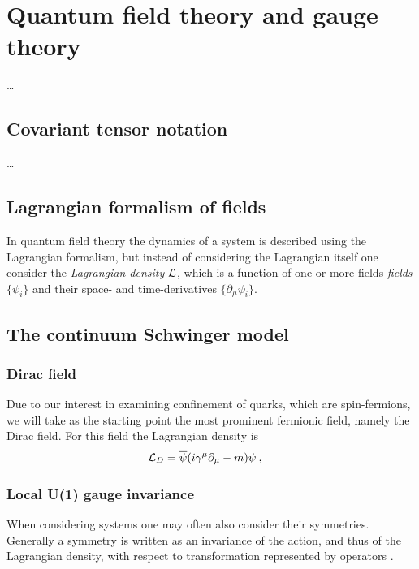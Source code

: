 \documentclass[../main.tex]{subfiles} %
\begin{document}
\chapter{Quantum field theory and gauge theory} \label{chap:ContinuumQFT}

\ldots



\section{Covariant tensor notation}

\ldots



\section{Lagrangian formalism of fields}

In quantum field theory the dynamics of a system is described using the Lagrangian formalism, but instead of considering the Lagrangian itself one consider the \emph{Lagrangian density}  $\mathcal{L}$, which is a function of one or more fields \emph{fields}  $\{\psi_i\}$ and their space- and time-derivatives $\{\partial_\mu \psi_i\}$.



\section{The continuum Schwinger model}

\subsection{Dirac field}

Due to our interest in examining confinement of quarks, which are spin-\half fermions, we will take as the starting point the most prominent fermionic field, namely the Dirac field. For this field the Lagrangian density  is
\begin{align}
    \mathcal{L}_D &= \overline{\psi} (i \gamma^\mu \partial_\mu - m) \psi \: ,
\end{align}


\subsection{Local U(1) gauge invariance}

When considering systems one may often also consider their symmetries. Generally a symmetry  is written as an invariance of the action, and thus of the Lagrangian density, with respect to transformation represented by operators \cite{peskin_introToQFT_1995}.
\end{document}
